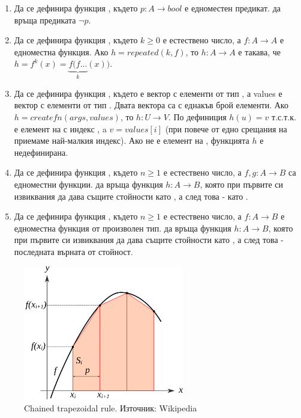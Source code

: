 \begin{enumerate}[resume]

  \item Да се дефинира функция , където $p:A \rightarrow bool$ е едноместен предикат.  да връща предиката $\neg p$.


  \item Да се дефинира функция , където $k \geq 0$ е естествено число, а $f:A \rightarrow A$ е едноместна функция. Ако $h=repeated(k,f)$, то $h:A \rightarrow A$ е такава, че $h=f^k(x)=\underbrace{f(f...}_{k}(x))$.

  \item Да се дефинира функция , където  е вектор с елементи от тип , а values е вектор с елементи от тип . Двата вектора са с еднакъв брой елементи. Ако $h=createfn(args,values)$, то $h:U \rightarrow V$. По дефиниция $h(u)=v$ т.с.т.к.  е елемент на  с индекс , a $v=values[i]$ (при повече от едно срещания на  приемаме най-малкия индекс). Ако  не е елемент на , функцията $h$ е недефинирана.

  \item Да се дефинира функция , където $n \geq 1$ е естествено число, а $f,g:A \rightarrow B$ са едноместни функции.  да връща функция $h:A \rightarrow B$, която при първите си  извиквания да дава същите стойности като , а след това - като .


  \item Да се дефинира функция , където $n \geq 1$ е естествено число, а $f:A \rightarrow B$ е едноместна функция от произволен тип.  да връща функция $h:A \rightarrow B$, която при първите си  извиквания да дава същите стойности като , а след това - последната върната от  стойност.
  
\end{enumerate}

\begin{figure}
  \begin{centering}
  \includegraphics[width=7cm]{images/trapezoidal}
  \caption{Chained trapezoidal rule. Източник: Wikipedia\cite{trapezoidal}}
  \label{fig:trapezoidal}
  \end{centering}
\end{figure}
  

